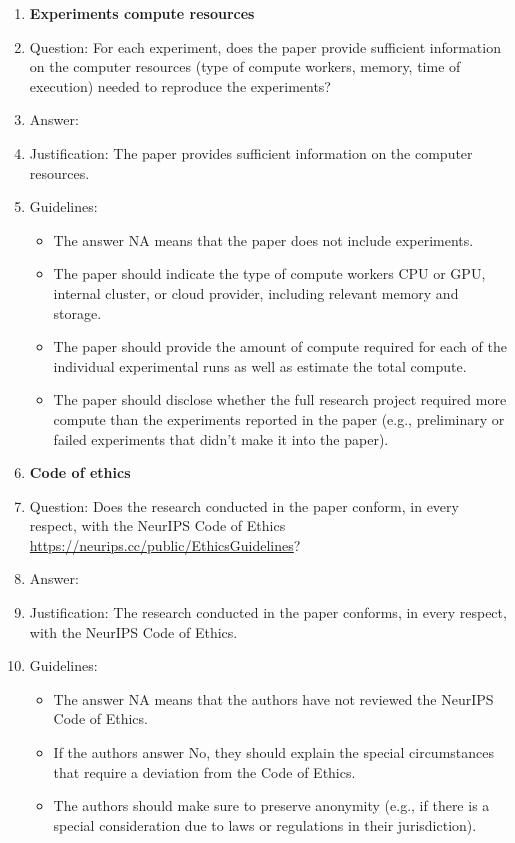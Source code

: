 \documentclass{article}
\numberwithin{equation}{section}
\theoremstyle{definition}
\begin{document}
\begin{enumerate}
\item {\bf Experiments compute resources}
    \item[] Question: For each experiment, does the paper provide sufficient information on the computer resources (type of compute workers, memory, time of execution) needed to reproduce the experiments?
    \item[] Answer: \answerYes{} %
    \item[] Justification: The paper provides sufficient information on the computer resources.
    \item[] Guidelines:
    \begin{itemize}
        \item The answer NA means that the paper does not include experiments.
        \item The paper should indicate the type of compute workers CPU or GPU, internal cluster, or cloud provider, including relevant memory and storage.
        \item The paper should provide the amount of compute required for each of the individual experimental runs as well as estimate the total compute. 
        \item The paper should disclose whether the full research project required more compute than the experiments reported in the paper (e.g., preliminary or failed experiments that didn't make it into the paper). 
    \end{itemize}
    
\item {\bf Code of ethics}
    \item[] Question: Does the research conducted in the paper conform, in every respect, with the NeurIPS Code of Ethics \url{https://neurips.cc/public/EthicsGuidelines}?
    \item[] Answer: \answerYes{} %
    \item[] Justification: The research conducted in the paper conforms, in every respect, with the NeurIPS Code of Ethics.
    \item[] Guidelines:
    \begin{itemize}
        \item The answer NA means that the authors have not reviewed the NeurIPS Code of Ethics.
        \item If the authors answer No, they should explain the special circumstances that require a deviation from the Code of Ethics.
        \item The authors should make sure to preserve anonymity (e.g., if there is a special consideration due to laws or regulations in their jurisdiction).
    \end{itemize}



\end{enumerate}
\end{document}
